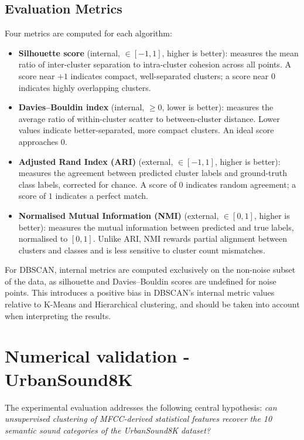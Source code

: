 \documentclass[runningheads,a4paper,11pt]{report}
\begin{document}
\subsection{Evaluation Metrics}
Four metrics are computed for each algorithm:
\begin{itemize}
    \item \textbf{Silhouette score} (internal, $\in [-1, 1]$, higher is better): measures the mean ratio of inter-cluster separation to intra-cluster cohesion across all points. A score near $+1$ indicates compact, well-separated clusters; a score near $0$ indicates highly overlapping clusters.

    \item \textbf{Davies--Bouldin index} (internal, $\geq 0$, lower is better): measures the average ratio of within-cluster scatter to between-cluster distance. Lower values indicate better-separated, more compact clusters. An ideal score approaches $0$.

    \item \textbf{Adjusted Rand Index (ARI)} (external, $\in [-1, 1]$, higher is better): measures the agreement between predicted cluster labels and ground-truth class labels, corrected for chance. A score of $0$ indicates random agreement; a score of $1$ indicates a perfect match.

    \item \textbf{Normalised Mutual Information (NMI)} (external, $\in [0, 1]$, higher is better): measures the mutual information between predicted and true labels, normalised to $[0,1]$. Unlike ARI, NMI rewards partial alignment between clusters and classes and is less sensitive to cluster count mismatches.
\end{itemize}

For DBSCAN, internal metrics are computed exclusively on the non-noise subset of the data, as silhouette and Davies--Bouldin scores are undefined for noise points. This introduces a positive bias in DBSCAN's internal metric values relative to K-Means and Hierarchical clustering, and should be taken into account when interpreting the results.


\section{Numerical validation - UrbanSound8K}
\label{section:numericalValidaion}

The experimental evaluation addresses the following central hypothesis: \textit{can unsupervised clustering of MFCC-derived statistical features recover the 10 semantic sound categories of the UrbanSound8K dataset?}
\end{document}
